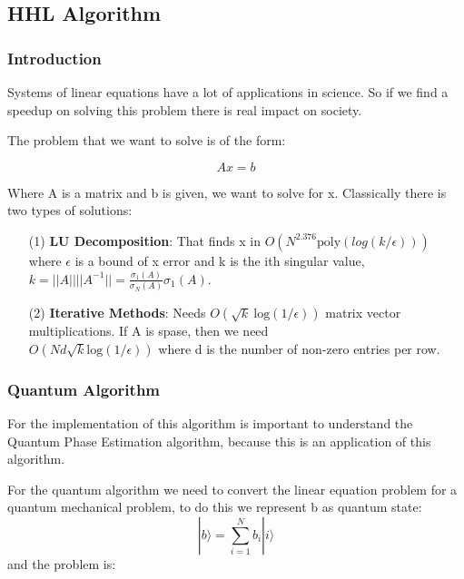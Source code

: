 \subsection{HHL Algorithm}
\label{subsec: HHL}

\subsubsection{Introduction}
\label{Subsubsec: HHL Introduction}

Systems of linear equations have a lot of applications in science. So if we find a speedup on solving this problem there is real impact on society. 

The problem that we want to solve is of the form:

\begin{equation}
A x = b
\end{equation}

Where A is a matrix and b is given, we want to solve for x. Classically there is two types of solutions:

\begin{itemize}
    \item[(1)] \textbf{LU Decomposition}: That finds x in $O(N^{2.376} \mathrm{poly}(log(k/\epsilon)))$ where $\epsilon$ is a bound of x error and k is the ith singular value, $k = ||A|| ||A^{-1}|| = \frac{\sigma_1(A)}{\sigma_N(A)} \sigma_1(A)$.

    \item[(2)] \textbf{Iterative Methods}: Needs $O(\sqrt{k} \ \mathrm{log}(1/\epsilon))$ matrix vector multiplications. If A is spase, then we need \\ $O(Nd\sqrt{k}  \mathrm{log}(1/\epsilon))$ where d is the number of non-zero entries per row.
\end{itemize}

\subsubsection{Quantum Algorithm}
\label{Subsubsec: HHL Algorithm}

For the implementation of this algorithm is important to understand the Quantum Phase Estimation algorithm, because this is an application of this algorithm.

For the quantum algorithm we need to convert the linear equation problem for a quantum mechanical problem, to do this we represent b as quantum state: $$ | b \rangle = \sum_{i=1}^N b_i | i \rangle$$ and  the problem is: 

